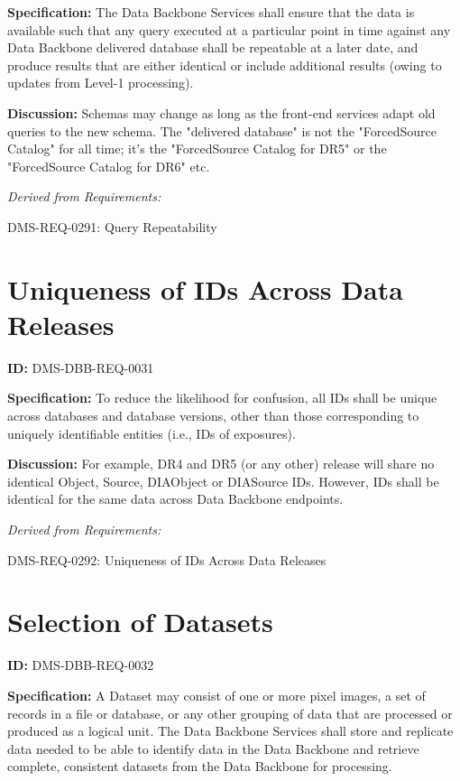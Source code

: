 \documentclass[SE,toc,lsstdraft]{lsstdoc}
\begin{document}
\textbf{Specification:}
The Data Backbone Services shall ensure that the data is available such that any query executed at a particular point in time against any Data Backbone delivered database shall be repeatable at a later date, and produce results that are either identical or include additional results (owing to updates from Level-1 processing).

\textbf{Discussion:}
Schemas may change as long as the front-end services adapt old queries to the new schema.   The "delivered database" is not the "ForcedSource Catalog" for all time; it's the "ForcedSource Catalog for DR5" or the "ForcedSource Catalog for DR6" etc.

\emph{Derived from Requirements:}

DMS-REQ-0291:
Query Repeatability \newline

\section{Uniqueness of IDs Across Data Releases}

\label{DMS-DBB-REQ-0031}
\textbf{ID:} DMS-DBB-REQ-0031

\textbf{Specification:}
To reduce the likelihood for confusion, all IDs shall be unique across databases and database versions, other than those corresponding to uniquely identifiable entities (i.e., IDs of exposures).

\textbf{Discussion:}
For example, DR4 and DR5 (or any other) release will share no identical Object, Source, DIAObject or DIASource IDs.    However, IDs shall be identical for the same data across Data Backbone endpoints.

\emph{Derived from Requirements:}

DMS-REQ-0292:
Uniqueness of IDs Across Data Releases \newline

\section{Selection of Datasets}

\label{DMS-DBB-REQ-0032}
\textbf{ID:} DMS-DBB-REQ-0032

\textbf{Specification:}
A Dataset may consist of one or more pixel images, a set of records in a file or database, or any other grouping of data that are processed or produced as a logical unit. The Data Backbone Services shall store and replicate data needed to be able to identify data in the Data Backbone and retrieve complete, consistent datasets from the Data Backbone for processing.
\end{document}
